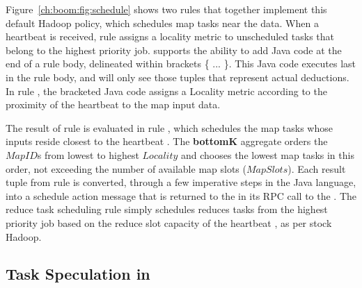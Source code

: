 Figure~\ref{ch:boom:fig:schedule} shows two rules that together implement this
default Hadoop policy, which schedules map tasks near the data.  When a \TT
heartbeat is received, rule  assigns a locality metric to unscheduled
tasks that belong to the highest priority job.  \JOL supports the ability to
add Java code at the end of a rule body, delineated within brackets \{ ...  \}.
This Java code executes last in the rule body, and will only see those tuples
that represent actual deductions.  In rule , the bracketed Java code
assigns a Locality metric according to the proximity of the heartbeat \TT to
the map input data.

The result of rule  is evaluated in rule , which schedules the
map tasks whose inputs reside closest to the heartbeat \TT.  The {\bf bottomK}
aggregate orders the $MapID$s from lowest to highest $Locality$ and chooses the
lowest map tasks in this order, not exceeding the number of available map slots
($MapSlots$).  Each result tuple from rule  is converted, through a few
imperative steps in the Java language, into a schedule action message that is
returned to the \TT in its RPC call to the \JT.  The reduce task scheduling
rule simply schedules reduces tasks from the highest priority job based on the
reduce slot capacity of the heartbeat \TT, as per stock Hadoop.

\subsection{Task Speculation in \OVERLOG}
\label{ch:boom:sec:late}

